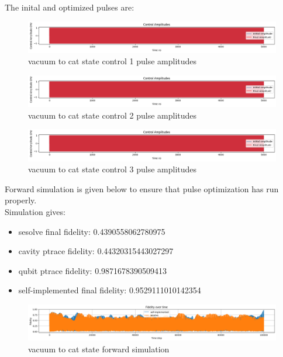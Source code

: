 \documentclass[12pt]{article}
\begin{document}
The inital and optimized pulses are: 
\begin{figure}[H]
    \centering
    \includegraphics[width=0.95\linewidth]{vac2cat_effective_Hamiltonian_GRAPE_control1.png}
    \caption{vacuum to cat state control 1 pulse amplitudes}
    \label{fig:vac2cat_effective_Hamiltonian_GRAPE_control1}
\end{figure}
\begin{figure}[H]
    \centering
    \includegraphics[width=0.95\linewidth]{vac2cat_effective_Hamiltonian_GRAPE_control2.png}
    \caption{vacuum to cat state control 2 pulse amplitudes}
    \label{fig:vac2cat_effective_Hamiltonian_GRAPE_control2}
\end{figure}
\begin{figure}[H]
    \centering
    \includegraphics[width=0.95\linewidth]{vac2cat_effective_Hamiltonian_GRAPE_control3.png}
    \caption{vacuum to cat state control 3 pulse amplitudes}
    \label{fig:vac2cat_effective_Hamiltonian_GRAPE_control3}
\end{figure}

Forward simulation is given below to ensure that pulse optimization has run properly. 
\\
Simulation gives: 
\begin{itemize}
    \item sesolve final fidelity:  0.4390558062780975
    \item cavity ptrace fidelity:  0.44320315443027297
    \item qubit ptrace fidelity:  0.9871678390509413
    \item self-implemented final fidelity:  0.9529111010142354
\end{itemize}
\begin{figure}[H]
    \centering
    \includegraphics[width=0.95\linewidth]{vac2cat_effective_Hamiltonian_GRAPE_simulations.png}
    \caption{vacuum to cat state forward simulation}
    \label{fig:vac2cat_effective_Hamiltonian_GRAPE_simulations}
\end{figure}
\end{document}
